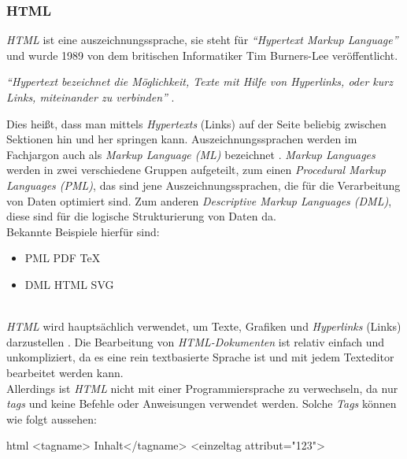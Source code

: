 		\subsubsection{HTML}
		\label{chapter:study-frontend-html}
		\textit{HTML} ist eine \Gls{auszeichnungssprache}, sie steht für \textit{\enquote{Hypertext Markup Language}} und wurde 1989 von dem britischen Informatiker Tim Burners-Lee veröffentlicht.\\ 
		\begin{center}
			\textit{\enquote{\textit{Hypertext} bezeichnet die Möglichkeit, Texte mit Hilfe von Hyperlinks, oder kurz Links, miteinander zu verbinden}} \cite{html5-css3-def}.
		\end{center}
		Dies heißt, dass man mittels \textit{Hypertexts} (Links) auf der Seite beliebig zwischen Sektionen hin und her springen kann.
		Auszeichnungssprachen werden im Fachjargon auch als \textit{Markup Language (ML)} bezeichnet \cite{auszeichnungssprachen}. \textit{Markup Languages} werden in zwei verschiedene Gruppen aufgeteilt, zum einen \textit{Procedural Markup Languages (PML)}, das sind jene Auszeichnungssprachen, die für die Verarbeitung von Daten optimiert sind. Zum anderen \textit{Descriptive Markup Languages (DML)}, diese sind für die logische Strukturierung von Daten da.\\Bekannte Beispiele hierfür sind:
		\begin{itemize}
		\item PML
		\subitem PDF
		\subitem TeX
		\item DML
		\subitem HTML
		\subitem SVG
		\end{itemize}
	\label{list:dmlbsp}~\\
		\textit{HTML} wird hauptsächlich verwendet, um Texte, Grafiken und \textit{Hyperlinks} (Links) darzustellen \cite{html5-css3-handbuch, html5-css3-def}. Die Bearbeitung von \textit{HTML-Dokumenten} ist relativ einfach und unkompliziert, da es eine rein textbasierte Sprache ist und mit jedem Texteditor bearbeitet werden kann.\\
		Allerdings ist \textit{HTML} nicht mit einer Programmiersprache zu verwechseln, da nur \textit{\Gls{tag}s} und keine Befehle oder Anweisungen verwendet werden. Solche \textit{Tags} können wie folgt aussehen:
		\begin{code}{html}
			<tagname> Inhalt</tagname>
			<einzeltag attribut="123">
		\end{code}
	\label{list:htmltags} ~\\
